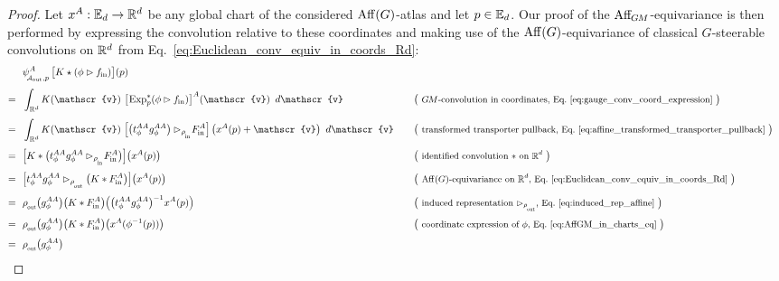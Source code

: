 \begin{proof}
    Let $x^A: \mathbb{E}_d \to \mathbb{R}^d$ be any global chart of the considered $\operatorname{Aff}(G)$-atlas and let $p\in\mathbb{E}_d$.
    Our proof of the $\operatorname{Aff}_{\mkern-2muG\mkern-1.4muM}$-equivariance is then performed by expressing the convolution relative to these coordinates and making use of the $\operatorname{Aff}(G)$-equivariance of classical $G$-steerable convolutions on $\mathbb{R}^d$ from Eq.~\eqref{eq:Euclidean_conv_equiv_in_coords_Rd}:
    \begingroup
    \allowdisplaybreaks
    \begin{align}
        &\ \ 
            \psiAoutp^A\, \big[K \star (\phi\rhd \fin) \big] (p)
            \\[.8ex]
        =&\ \ 
            \int_{\R^d} K(\mathscr{v})\ 
            \big[\mkern-2mu \Expsp (\phi \rhd \fin) \big]^A (\mathscr{v})
            \,\ d\mathscr{v}
        \quad && \big( \text{\small $\GM$-convolution in coordinates, Eq.~\eqref{eq:gauge_conv_coord_expression} } \big) \notag \\[.8ex]
        =&\ \ 
            \int_{\R^d} K(\mathscr{v})\ 
            \pig[\big( t_\phi^{AA} g_\phi^{AA} \big) \rhd_{\rhoin}\! \Fin^A \pig]\, \big(x^A(p) + \mathscr{v} \big)
            \,\ d\mathscr{v}
        \quad && \big( \text{\small transformed transporter pullback, Eq.~\eqref{eq:affine_transformed_transporter_pullback} } \big) \notag \\[.8ex]
        =&\ \ 
            \pig[ K * \big( t_\phi^{AA} g_\phi^{AA} \rhd_{\rhoin}\! \Fin^A \big) \pig] \big( x^A(p) \big)
        \quad && \big( \text{\small identified convolution $*$ on $\R^d$ } \big) \notag \\[.8ex]
        =&\ \ 
            \pig[ t_\phi^{AA} g_\phi^{AA} \rhd_{\rhoout} \big( K * \Fin^A \big) \pig] \big( x^A(p) \big)
        \quad && \big( \text{\small $\Aff(G)$-equivariance on $\R^d$, Eq.~\eqref{eq:Euclidean_conv_equiv_in_coords_Rd} } \big) \notag \\[.8ex]
        =&\ \ 
            \rhoout \big( g_\phi^{AA} \big) \big( K * \Fin^A \big) \pig(\big( t_\phi^{AA} g_\phi^{AA} \big)^{-1} x^A(p) \pig)
        \quad && \big( \text{\small induced representation $\rhd_{\rhoout}$, Eq.~\eqref{eq:induced_rep_affine} } \big) \notag \\[.8ex]
        =&\ \ 
            \rhoout \big( g_\phi^{AA} \big) \big( K * \Fin^A \big) \big( x^A (\phi^{-1}(p)) \big)
        \quad && \big( \text{\small coordinate expression of $\phi$, Eq.~\eqref{eq:AffGM_in_charts_eq} } \big) \notag \\[.8ex]
        =&\ \ 
            \rhoout\big( g_\phi^{AA} \big)

\end{align}
\end{proof}
